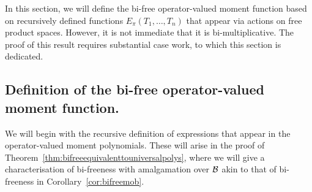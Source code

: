 In this section, we will define the bi-free operator-valued moment function based on recursively defined functions $E_\pi(T_1,\ldots, T_n)$ that appear via actions on free product spaces.
However, it is not immediate that it is bi-multiplicative.
The proof of this result requires substantial case work, to which this section is dedicated.


\subsection{Definition of the bi-free operator-valued moment function.}

We will begin with the recursive definition of expressions that appear in the operator-valued moment polynomials.
These will arise in the proof of Theorem~\ref{thm:bifreeequivalenttouniversalpolys}, where we will give a characterisation of bi-freeness with amalgamation over $\mathcal{B}$ akin to that of bi-freeness in Corollary~\ref{cor:bifreemob}.

